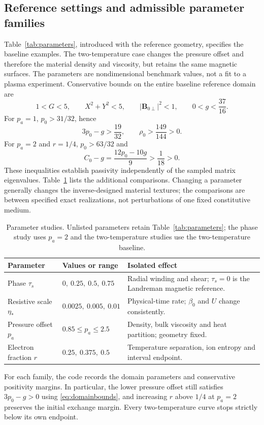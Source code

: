 \documentclass[11pt,a4paper]{article}
\theoremstyle{remark}\newtheorem{remark}{Remark}
\numberwithin{equation}{section}
\newcommand{\BB}{\boldsymbol B}
\begin{document}
\subsection{Reference settings and admissible parameter families}
Table~\ref{tab:parameters}, introduced with the reference geometry, specifies the baseline examples. The two-temperature case changes the pressure offset and therefore the material density and viscosity, but retains the same magnetic surfaces. The parameters are nondimensional benchmark values, not a fit to a plasma experiment. Conservative bounds on the entire baseline reference domain are
\begin{equation}
1<G<5,\qquad X^2+Y^2<5,\qquad
|\BB_{0\perp}|^2<1,\qquad 0<g<\frac{37}{16}.
\label{eq:domainbounds}
\end{equation}
For $p_a=1$, $p_0>31/32$, hence
\begin{equation}
3p_0-g>\frac{19}{32},\qquad \rho_0>\frac{149}{144}>0.
\label{eq:passivitybounds}
\end{equation}
For $p_a=2$ and $r=1/4$, $p_0>63/32$ and
\begin{equation}
C_0-g=\frac{12p_0-10g}{9}>\frac1{18}>0.
\label{eq:twopassivity}
\end{equation}
These inequalities establish passivity independently of the sampled matrix eigenvalues. Table~\ref{tab:sweeps} lists the additional comparisons. Changing a parameter generally changes the inverse-designed material textures; the comparisons are between specified exact realizations, not perturbations of one fixed constitutive medium.
\begin{table}[H]
\centering\small
\caption{Parameter studies. Unlisted parameters retain Table~\ref{tab:parameters}; the phase study uses $p_a=2$ and the two-temperature studies use the two-temperature baseline.}
\label{tab:sweeps}
\begin{tabularx}{\linewidth}{@{}p{.17\linewidth}p{.32\linewidth}X@{}}\toprule
Parameter & Values or range & Isolated effect\\\midrule
Phase $\tau_s$ & $0,\ 0.25,\ 0.5,\ 0.75$ & Radial winding and shear; $\tau_s=0$ is the Landreman magnetic reference.\\
Resistive scale $\eta_*$ & $0.0025,\ 0.005,\ 0.01$ & Physical-time rate; $\beta_0$ and $U$ change consistently.\\
Pressure offset $p_a$ & $0.85\le p_a\le2.5$ & Density, bulk viscosity and heat partition; geometry fixed.\\
Electron fraction $r$ & $0.25,\ 0.375,\ 0.5$ & Temperature separation, ion entropy and interval endpoint.\\\bottomrule
\end{tabularx}
\end{table}
For each family, the code records the domain parameters and conservative positivity margins. In particular, the lower pressure offset still satisfies $3p_0-g>0$ using \eqref{eq:domainbounds}, and increasing $r$ above $1/4$ at $p_a=2$ preserves the initial exchange margin. Every two-temperature curve stops strictly below its own endpoint.
\end{document}
